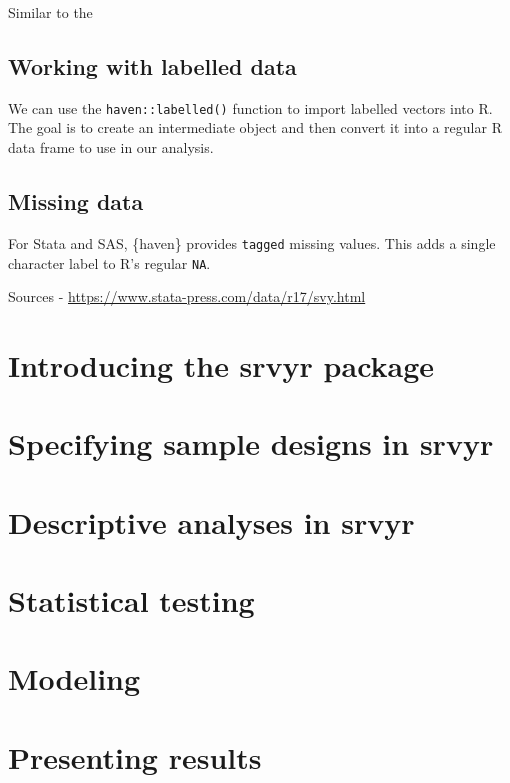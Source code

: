 \documentclass[
]{krantz}
\begin{document}
Similar to the

\hypertarget{working-with-labelled-data}{%
\section{Working with labelled data}\label{working-with-labelled-data}}

We can use the \texttt{haven::labelled()} function to import labelled vectors into R. The goal is to create an intermediate object and then convert it into a regular R data frame to use in our analysis.

\hypertarget{missing-data}{%
\section{Missing data}\label{missing-data}}

For Stata and SAS, \{haven\} provides \texttt{tagged} missing values. This adds a single character label to R's regular \texttt{NA}.

Sources
- \url{https://www.stata-press.com/data/r17/svy.html}

\hypertarget{c04}{%
\chapter{Introducing the srvyr package}\label{c04}}

\hypertarget{c05}{%
\chapter{Specifying sample designs in srvyr}\label{c05}}

\hypertarget{c06}{%
\chapter{Descriptive analyses in srvyr}\label{c06}}

\hypertarget{c07}{%
\chapter{Statistical testing}\label{c07}}

\hypertarget{c08}{%
\chapter{Modeling}\label{c08}}

\hypertarget{c09}{%
\chapter{Presenting results}\label{c09}}
\end{document}
